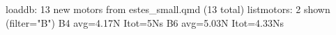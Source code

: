 \begin{console}
\ok loaddb: 13 new motors from estes_small.qmd (13 total)
\ok listmotors: 2 shown (filter="B")
B4  avg=4.17N  Itot=5Ns
B6  avg=5.03N  Itot=4.33Ns
\end{console}
